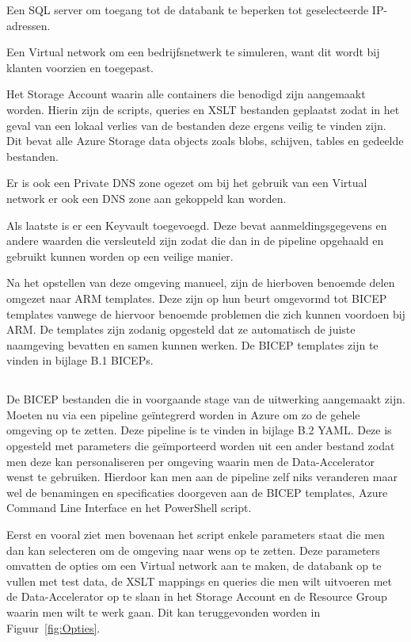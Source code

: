Een SQL server om toegang tot de databank te beperken tot geselecteerde IP-adressen.

Een Virtual network om een bedrijfsnetwerk te simuleren, want dit wordt bij klanten voorzien en toegepast.

Het Storage Account waarin alle containers die benodigd zijn aangemaakt worden. Hierin zijn de scripts, queries en XSLT bestanden geplaatst zodat in het geval van een lokaal verlies van de bestanden deze ergens veilig te vinden zijn. Dit bevat alle Azure Storage data objects zoals blobs, schijven, tables en gedeelde bestanden.

Er is ook een Private DNS zone ogezet om bij het gebruik van een Virtual network er ook een DNS zone aan gekoppeld kan worden.

Als laatste is er een Keyvault toegevoegd. Deze bevat aanmeldingsgegevens en andere waarden die versleuteld zijn zodat die dan in de pipeline opgehaald en gebruikt kunnen worden op een veilige manier.

Na het opstellen van deze omgeving manueel, zijn de hierboven benoemde delen omgezet naar ARM templates. Deze zijn op hun beurt omgevormd tot BICEP templates vanwege de hiervoor benoemde problemen die zich kunnen voordoen bij ARM. De templates zijn zodanig opgesteld dat ze automatisch de juiste naamgeving bevatten en samen kunnen werken. De BICEP templates zijn te vinden in bijlage B.1 BICEPs.



\subsection{}%
\label{sec:Pipeline}

De BICEP bestanden die in voorgaande stage van de uitwerking aangemaakt zijn. Moeten nu via een pipeline geïntegrerd worden in Azure om zo de gehele omgeving op te zetten. Deze pipeline is te vinden in bijlage B.2 YAML. Deze is opgesteld met parameters die geïmporteerd worden uit een ander bestand zodat men deze kan personaliseren per omgeving waarin men de Data-Accelerator wenst te gebruiken. Hierdoor kan men aan de pipeline zelf niks veranderen maar wel de benamingen en specificaties doorgeven aan de BICEP templates, Azure Command Line Interface en het PowerShell script.

Eerst en vooral ziet men bovenaan het script enkele parameters staat die men dan kan selecteren om de omgeving naar wens op te zetten. Deze parameters omvatten de opties om een Virtual network aan te maken, de databank op te vullen met test data, de XSLT mappings en queries die men wilt uitvoeren met de Data-Accelerator op te slaan in het Storage Account en de Resource Group waarin men wilt te werk gaan. Dit kan teruggevonden worden in Figuur~\ref{fig:Opties}.

